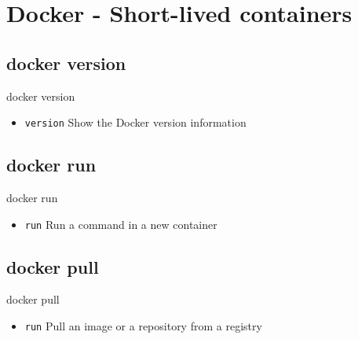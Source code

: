 
\section{Docker - Short-lived containers}\label{sec:docker-short-lived-containers}

\subsection{docker version}\label{subsec:docker-version}
\begin{frame}{docker version}
    \begin{itemize}
        \item \texttt{version} Show the Docker version information
        \pause
        
    \end{itemize}
\end{frame}

\subsection{docker run}\label{subsec:docker-run}
\begin{frame}{docker run}
    \begin{itemize}
        \item \texttt{run} Run a command in a new container
        \pause
        
    \end{itemize}
\end{frame}

\subsection{docker pull}\label{subsec:docker-pull}
\begin{frame}{docker pull}
    \begin{itemize}
        \item \texttt{run} Pull an image or a repository from a registry
        \pause
        
    \end{itemize}
\end{frame}

